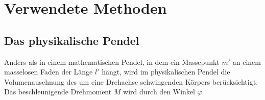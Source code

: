 \section{Verwendete Methoden}
\subsection{Das physikalische Pendel}
Anders als in einem mathematischen Pendel, in dem ein Massepunkt $m'$ an einem masselosen Faden der Länge $l'$ hängt, wird im physikalischen Pendel die Volumenausehnung des um eine Drehachse schwingenden Körpers berücksichtigt. Das beschleunigende Drehmoment $M$ wird durch den Winkel $\varphi$